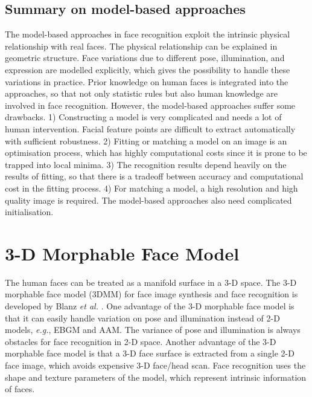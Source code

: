 \subsection{Summary on model-based approaches}
The model-based approaches in face recognition exploit the intrinsic physical relationship with real faces. The physical relationship can be explained in geometric structure. Face variations due to different pose, illumination, and expression are modelled explicitly, which gives the possibility to handle these variations in practice. Prior knowledge on human faces is integrated into the approaches, so that not only statistic rules but also human knowledge are involved in face recognition. However, the model-based approaches suffer some drawbacks. 1) Constructing a model is very complicated and needs a lot of human intervention. Facial feature points are difficult to extract automatically with sufficient robustness. 2) Fitting or matching a model on an image is an optimisation process, which has highly computational costs since it is prone to be trapped into local minima. 3) The recognition results depend heavily on the results of fitting, so that there is a tradeoff between accuracy and computational cost in the fitting process. 4) For matching a model, a high resolution and high quality image is required. The model-based approaches also need complicated initialisation.

\section{3-D Morphable Face Model}\label{sec:3DMM}
The human faces can be treated as a manifold surface in a 3-D space. The 3-D morphable face model (3DMM) for face image synthesis and face recognition is developed by Blanz \textit{et al.} \cite{Blanz1999,Blanz2003}. One advantage of the 3-D morphable face model is that it can easily handle variation on pose and illumination instead of 2-D models, \textit{e.g.}, EBGM and AAM. The variance of pose and illumination is always obstacles for face recognition in 2-D space. Another advantage of the 3-D morphable face model is that a 3-D face surface is extracted from a single 2-D face image, which avoids expensive 3-D face/head scan. Face recognition uses the shape and texture parameters of the model, which represent intrinsic information of faces. 

